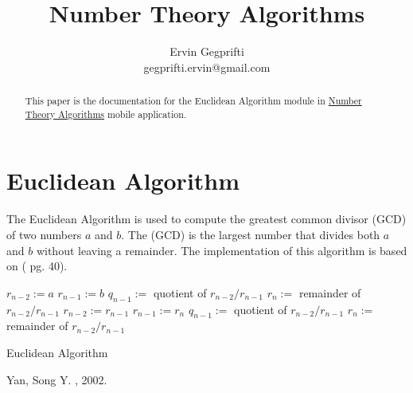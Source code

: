 \documentclass[12pt,oneside,a4paper]{article}
\title{Number Theory Algorithms}
\author{Ervin Gegprifti \\ [6pt]
	gegprifti.ervin@gmail.com}
\date{}
\begin{document}
\pagecolor{bgcolor}

\maketitle

\begin{abstract}
	This paper is the documentation for the Euclidean Algorithm module in \href{https://play.google.com/store/apps/details?id=com.gegprifti.android.numbertheoryalgorithms}{Number Theory Algorithms} mobile application.
\end{abstract}

\section*{Euclidean Algorithm}	
The Euclidean Algorithm is used to compute the greatest common divisor (GCD) of two numbers $a$ and $b$. The (GCD) is the largest number that divides both $a$ and $b$ without leaving a remainder. The implementation of this algorithm is based on (\cite{yan2002number} pg. 40). \\

\begin{algorithm}[H]
\DontPrintSemicolon
\SetAlgoLined
{}
\BlankLine
{}
\BlankLine
$r_{n-2}:=a$ \;
$r_{n-1}:=b$ \;
$q_{n-1}:=$ quotient of $r_{n-2}/r_{n-1}$ \;
$r_n:=$ remainder of $r_{n-2}/r_{n-1}$ \;
\BlankLine
{}
{
  $r_{n-2}:=r_{n-1}$ \;
  $r_{n-1}:=r_n$ \;
  $q_{n-1}:=$ quotient of $r_{n-2}/r_{n-1}$ \;
  $r_n:=$ remainder of $r_{n-2}/r_{n-1}$ \;
}
\BlankLine
{}
\caption{Euclidean Algorithm}
\end{algorithm}




\begin{thebibliography}{}
	
	Yan, Song Y.
	, 2002.
\end{thebibliography}
%
\end{document}

